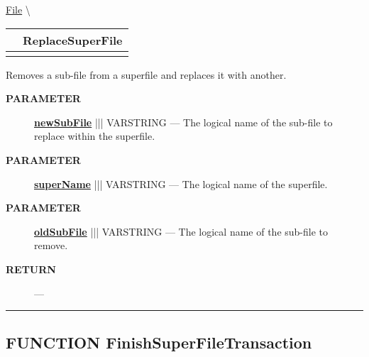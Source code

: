 \hypertarget{ecldoc:file.replacesuperfile}{}
\hspace{0pt} \hyperlink{ecldoc:File}{File} \textbackslash 

{\renewcommand{\arraystretch}{1.5}
\begin{tabularx}{\textwidth}{|>{\raggedright\arraybackslash}l|X|}
\hline
\hspace{0pt}\mytexttt{\color{red} } & \textbf{ReplaceSuperFile} \\
\hline
\multicolumn{2}{|>{\raggedright\arraybackslash}X|}{\hspace{0pt}\mytexttt{\color{param} (varstring superName, varstring oldSubFile, varstring newSubFile)}} \\
\hline
\end{tabularx}
}

\par





Removes a sub-file from a superfile and replaces it with another.






\par
\begin{description}
\item [\colorbox{tagtype}{\color{white} \textbf{\textsf{PARAMETER}}}] \textbf{\underline{newSubFile}} ||| VARSTRING --- The logical name of the sub-file to replace within the superfile.
\item [\colorbox{tagtype}{\color{white} \textbf{\textsf{PARAMETER}}}] \textbf{\underline{superName}} ||| VARSTRING --- The logical name of the superfile.
\item [\colorbox{tagtype}{\color{white} \textbf{\textsf{PARAMETER}}}] \textbf{\underline{oldSubFile}} ||| VARSTRING --- The logical name of the sub-file to remove.
\end{description}







\par
\begin{description}
\item [\colorbox{tagtype}{\color{white} \textbf{\textsf{RETURN}}}] \textbf{} --- 
\end{description}




\rule{\linewidth}{0.5pt}
\subsection*{\textsf{\colorbox{headtoc}{\color{white} FUNCTION}
FinishSuperFileTransaction}}

